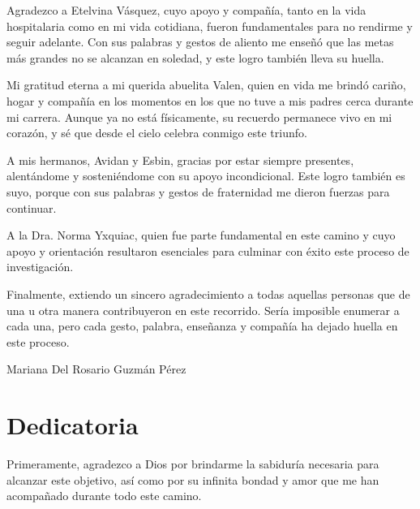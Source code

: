 \documentclass[11pt,letterpaper]{report}
\begin{document}
Agradezco a Etelvina Vásquez, cuyo apoyo y compañía, tanto en la vida 
hospitalaria como en mi vida cotidiana, fueron fundamentales para no rendirme 
y seguir adelante. Con sus palabras y gestos de aliento me enseñó que las 
metas más grandes no se alcanzan en soledad, y este logro también lleva su 
huella.

Mi gratitud eterna a mi querida abuelita Valen, quien en vida me brindó 
cariño, hogar y compañía en los momentos en los que no tuve a mis padres cerca 
durante mi carrera. Aunque ya no está físicamente, su recuerdo permanece vivo 
en mi corazón, y sé que desde el cielo celebra conmigo este triunfo.

A mis hermanos, Avidan y Esbin, gracias por estar siempre presentes, 
alentándome y sosteniéndome con su apoyo incondicional. Este logro también es 
suyo, porque con sus palabras y gestos de fraternidad me dieron fuerzas para 
continuar.

A la Dra. Norma Yxquiac, quien fue parte fundamental en este camino y cuyo 
apoyo y orientación resultaron esenciales para culminar con éxito este proceso 
de investigación.

Finalmente, extiendo un sincero agradecimiento a todas aquellas personas que 
de una u otra manera contribuyeron en este recorrido. Sería imposible enumerar 
a cada una, pero cada gesto, palabra, enseñanza y compañía ha dejado huella en 
este proceso.




\begin{flushright}
Mariana Del Rosario Guzmán Pérez
\end{flushright}

\chapter*{Dedicatoria}
Primeramente, agradezco a Dios por brindarme la sabiduría necesaria para
alcanzar este objetivo, así como por su infinita bondad y amor que me han
acompañado durante todo este camino.
\end{document}
